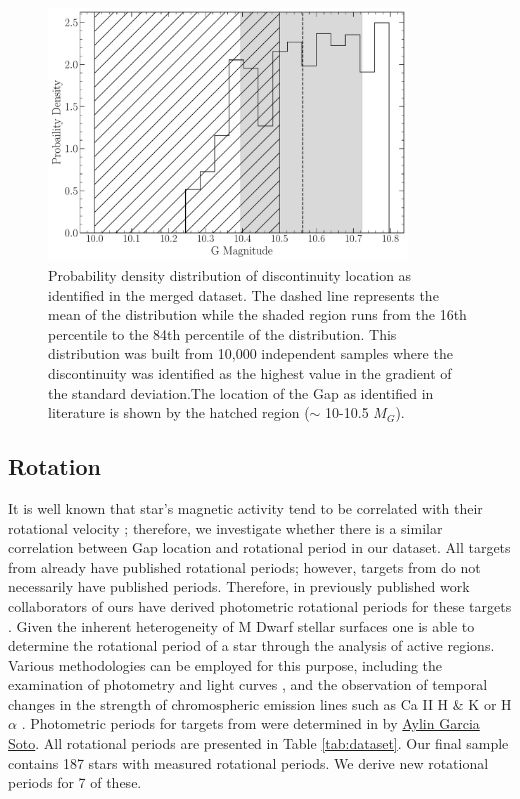 \begin{figure}
  \centering
  \includegraphics[width=0.85\textwidth]{figures/jaoMagActivity/GapLocationMC.pdf}
  \caption{Probability density distribution of discontinuity location as
  identified in the merged dataset. The dashed line represents the mean of the
  distribution while the shaded region runs from the 16th percentile to the
  84th percentile of the distribution. This distribution was built from 10,000
  independent samples where the discontinuity was identified as the highest
  value in the gradient of the standard deviation.The location of the Gap
  as identified in literature is shown by the hatched region ($\sim$ 10-10.5 $M_{G}$).}
  \label{fig:GapLocationMC}
\end{figure}

\subsection{Rotation}
It is well known that star's magnetic activity tend to be correlated with their
rotational velocity \citep{Vaughan1981, Newton2016, Astudillo-Defru2017,
Houdebine2017, Boudreaux2022}; therefore, we investigate whether there is a
similar correlation between Gap location and rotational period in our dataset.
All targets from \citet{Boudreaux2022} already have published rotational
periods; however, targets from \citet{Perdelwitz2021} do not necessarily have
published periods. Therefore, in previously published work collaborators of ours have derived photometric rotational periods for
these targets \citep{Boudreaux2024}. Given the inherent heterogeneity of M Dwarf stellar
surfaces \citep{Boisse2011, Robertson2020} one is able to determine the
rotational period of a star through the analysis of active regions. Various
methodologies can be employed for this purpose, including the examination of
photometry and light curves \citep[e.g.,][]{Newton2016}, and the observation of
temporal changes in the strength of chromospheric emission lines such as Ca II
H \& K or H$\alpha$ \citep[e.g.,][]{2019A&A...623A..24F,2023MNRAS.518.3147K}.
Photometric periods for targets from \citet{Perdelwitz2021} were determined in \citet{Boudreaux2024} by \href{https://orcid.org/0000-0001-9828-3229}{Aylin Garcia Soto}. All rotational periods are presented in Table \ref{tab:dataset}. Our
final sample contains 187 stars with measured rotational periods. We derive new
rotational periods for 7 of these. 

